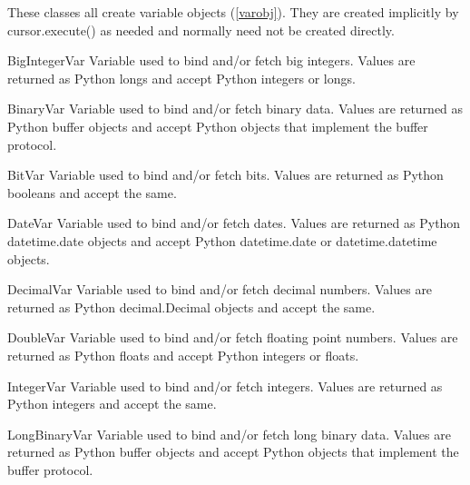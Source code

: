 \documentclass{manual}
\begin{document}
These classes all create variable objects (\ref{varobj}). They are created
implicitly by cursor.execute() as needed and normally need not be created
directly.

\begin{datadesc}{BigIntegerVar}
  Variable used to bind and/or fetch big integers. Values are returned as
  Python longs and accept Python integers or longs.
\end{datadesc}

\begin{datadesc}{BinaryVar}
  Variable used to bind and/or fetch binary data. Values are returned as Python
  buffer objects and accept Python objects that implement the buffer protocol.
\end{datadesc}

\begin{datadesc}{BitVar}
  Variable used to bind and/or fetch bits. Values are returned as Python
  booleans and accept the same.
\end{datadesc}

\begin{datadesc}{DateVar}
  Variable used to bind and/or fetch dates. Values are returned as Python
  datetime.date objects and accept Python datetime.date or datetime.datetime
  objects.
\end{datadesc}

\begin{datadesc}{DecimalVar}
  Variable used to bind and/or fetch decimal numbers. Values are returned as
  Python decimal.Decimal objects and accept the same.
\end{datadesc}

\begin{datadesc}{DoubleVar}
  Variable used to bind and/or fetch floating point numbers. Values are
  returned as Python floats and accept Python integers or floats.
\end{datadesc}

\begin{datadesc}{IntegerVar}
  Variable used to bind and/or fetch integers. Values are returned as Python
  integers and accept the same.
\end{datadesc}

\begin{datadesc}{LongBinaryVar}
  Variable used to bind and/or fetch long binary data. Values are returned as
  Python buffer objects and accept Python objects that implement the buffer
  protocol.
\end{datadesc}
\end{document}
